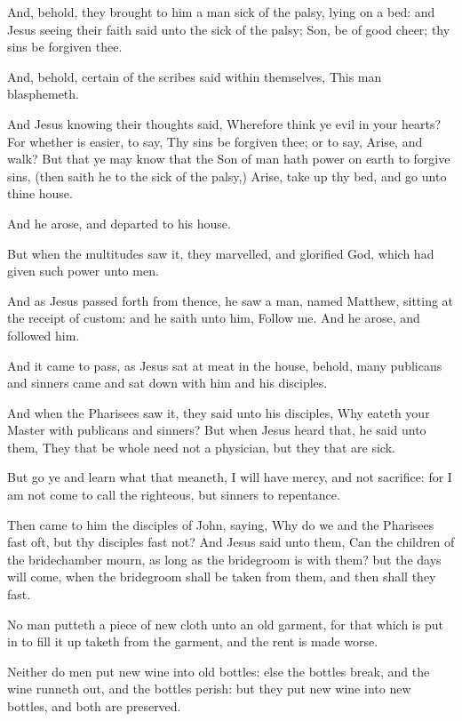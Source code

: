 \verse And, behold, they brought to him a man sick of the palsy, lying on a bed: and Jesus seeing their faith said unto the sick of the palsy; Son, be of good cheer; thy sins be forgiven thee.

\verse And, behold, certain of the scribes said within themselves, This man blasphemeth.

\verse And Jesus knowing their thoughts said, Wherefore think ye evil in your hearts?  \verse For whether is easier, to say, Thy sins be forgiven thee; or to say, Arise, and walk?  \verse But that ye may know that the Son of man hath power on earth to forgive sins, (then saith he to the sick of the palsy,) Arise, take up thy bed, and go unto thine house.

\verse And he arose, and departed to his house.

\verse But when the multitudes saw it, they marvelled, and glorified God, which had given such power unto men.

\verse And as Jesus passed forth from thence, he saw a man, named Matthew, sitting at the receipt of custom: and he saith unto him, Follow me. And he arose, and followed him.

\verse And it came to pass, as Jesus sat at meat in the house, behold, many publicans and sinners came and sat down with him and his disciples.

\verse And when the Pharisees saw it, they said unto his disciples, Why eateth your Master with publicans and sinners?  \verse But when Jesus heard that, he said unto them, They that be whole need not a physician, but they that are sick.

\verse But go ye and learn what that meaneth, I will have mercy, and not sacrifice: for I am not come to call the righteous, but sinners to repentance.

\verse Then came to him the disciples of John, saying, Why do we and the Pharisees fast oft, but thy disciples fast not?  \verse And Jesus said unto them, Can the children of the bridechamber mourn, as long as the bridegroom is with them? but the days will come, when the bridegroom shall be taken from them, and then shall they fast.

\verse No man putteth a piece of new cloth unto an old garment, for that which is put in to fill it up taketh from the garment, and the rent is made worse.

\verse Neither do men put new wine into old bottles: else the bottles break, and the wine runneth out, and the bottles perish: but they put new wine into new bottles, and both are preserved.

